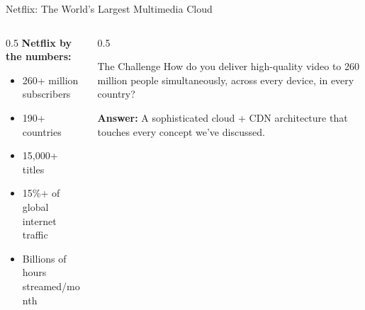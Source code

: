 \documentclass[aspectratio=169,12pt]{beamer}
\begin{document}
\begin{frame}{Netflix: The World's Largest Multimedia Cloud}
    \begin{columns}
        \begin{column}{0.5\textwidth}
            \textbf{Netflix by the numbers:}
            \begin{itemize}
                \item 260+ million subscribers
                \item 190+ countries
                \item 15,000+ titles
                \item 15\%+ of global internet traffic
                \item Billions of hours streamed/month
            \end{itemize}
        \end{column}
        \begin{column}{0.5\textwidth}
            \begin{block}{The Challenge}
                How do you deliver high-quality video to 260 million people simultaneously, across every device, in every country?
            \end{block}
            
            \vspace{0.3cm}
            \textbf{Answer:} A sophisticated cloud + CDN architecture that touches every concept we've discussed.
        \end{column}
    \end{columns}
\end{frame}
\end{document}
